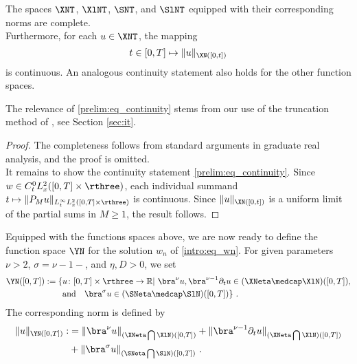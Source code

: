 \documentclass[11pt]{article}
\begin{document}
\begin{lem}\label{prelim:lem_basic_properties}
The spaces \( \XNT \), \( \XlNT \), \( \SNT \), and \( \SlNT \) equipped with their corresponding norms are complete. \\
Furthermore, for each \( u \in \XNT \), the mapping
\begin{equation}\label{prelim:eq_continuity}
t \in [0,T] \mapsto \| u \|_{\XN([0,t])} 
\end{equation}
is continuous. An analogous continuity statement also holds for the other function spaces. 
\end{lem}
The relevance of \eqref{prelim:eq_continuity} stems from our use of the truncation method of \cite{BD99}, see Section \ref{sec:it}.
\begin{proof}
The completeness follows from standard arguments in graduate real analysis, and the proof is omitted. \\
It remains to show the continuity statement \eqref{prelim:eq_continuity}. Since \( w\in C_t^0 L_x^2([0,T]\times \rthree)\), each individual summand \( t \mapsto \| P_M u \|_{L_t^\infty L_x^2([0,T]\times \rthree)} \) is continuous. Since \( \| u \|_{\XN([0,t])} \) is a uniform limit of the partial sums in \( M \geq 1 \), the result follows. 
\end{proof}
Equipped with the functions spaces above, we are now ready to define the function space \( \YN \) for the solution \( w_n \) of \eqref{intro:eq_wn}. For given parameters \( \nu > 2 \), \( \sigma = \nu-1 - \), and \( \eta,D > 0 \), we set 
\begin{equation}\label{prelim:eq_YN}
\begin{aligned}
\YN([0,T]):=\{& u \colon [0,T]\times \rthree \rightarrow \mathbb{R} | ~ \bra^\nu u, \bra^{\nu-1} \partial_t u\in ( \XNeta \medcap \XlN)([0,T]), \\
& \text{and} \quad \bra^\sigma u \in (\SNeta \medcap \SlN)([0,T]) \}~. \\
\end{aligned}
\end{equation}
The corresponding norm is defined by
\begin{equation*}
\begin{aligned}
\| u \|_{\YN([0,T])} :&= \| \bra^\nu u \|_{(\XNeta \bigcap \XlN)([0,T])} +  \| \bra^{\nu-1} \partial_t u \|_{(\XNeta \bigcap \XlN)([0,T])}  \\
&+ \| \bra^\sigma u \|_{(\SNeta \bigcap \SlN)([0,T])}~. 
\end{aligned}
\end{equation*}
\end{document}

